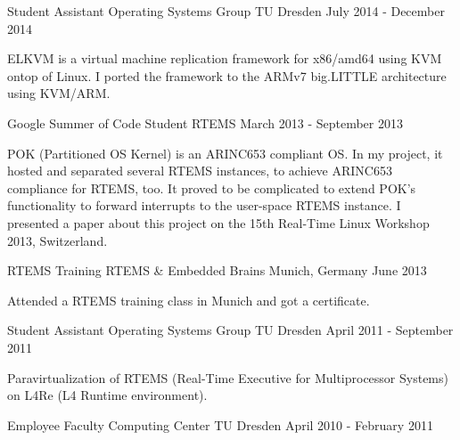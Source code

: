 \begin{cventries}
  \cventry
    {Student Assistant}
    {Operating Systems Group}
    {TU Dresden}
    {July 2014 - December 2014}
    {
      \begin{cvitems}
      \item[] {ELKVM is a virtual machine replication framework for x86/amd64 using KVM
      ontop of Linux. I ported the framework to the ARMv7 big.LITTLE
      architecture using KVM/ARM.}
      \end{cvitems}
    }
  \cventry
    {Google Summer of Code Student}
    {RTEMS}
    {}
    {March 2013 - September 2013}
    {
      \begin{cvitems}
      \item[] {POK (Partitioned OS Kernel) is an ARINC653 compliant OS. In my
	  project, it hosted and separated several RTEMS instances, to achieve
      ARINC653 compliance for RTEMS, too. It proved to be complicated to extend
      POK's functionality to forward interrupts to the user-space RTEMS
      instance. I presented a paper about this project on the 15th Real-Time Linux
    Workshop 2013, Switzerland.}
      \end{cvitems}
    }
  \cventry
    {RTEMS Training}
    {RTEMS \& Embedded Brains}
    {Munich, Germany}
    {June 2013}
    {
      \begin{cvitems}
      \item[] {Attended a RTEMS training class in Munich and got a
	certificate.}
      \end{cvitems}
    }
  \cventry
    {Student Assistant}
    {Operating Systems Group}
    {TU Dresden}
    {April 2011 - September 2011}
    {
      \begin{cvitems}
      \item[] {Paravirtualization of RTEMS (Real-Time Executive for
	Multiprocessor Systems) on L4Re (L4 Runtime environment).}
      \end{cvitems}
    }
  \cventry
    {Employee}
    {Faculty Computing Center}
    {TU Dresden}
    {April 2010 - February 2011}
    {}
\end{cventries}

